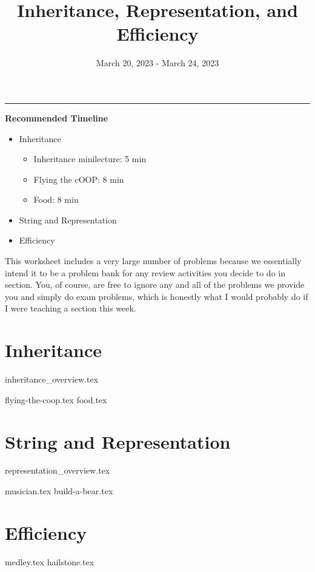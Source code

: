 \documentclass{exam}
\title{Inheritance, Representation, and Efficiency}
\date{March 20, 2023 - March 24, 2023}
\begin{document}
\maketitle
\rule{\textwidth}{0.15em}

\begin{meta}
    \textbf{Recommended Timeline}
    \begin{itemize}
        \item Inheritance
        \begin{itemize}
            \item Inheritance minilecture: 5 min
            \item Flying the cOOP: 8 min
            \item Food: 8 min
        \end{itemize}
        \item String and Representation
        \item Efficiency
    \end{itemize}
    This worksheet includes a very large number of problems because we essentially intend it to be a problem bank for any review activities you decide to do in section. You, of course, are free to ignore any and all of the problems we provide you and simply do exam problems, which is honestly what I would probably do if I were teaching a section this week. 
\end{meta}

\section{Inheritance}
{inheritance_overview.tex}
\begin{questions}
    {flying-the-coop.tex}
    \newpage
    {food.tex}
    \newpage
\end{questions}

\section{String and Representation}
{representation_overview.tex}
\begin{questions}
    {musician.tex}
    {build-a-bear.tex}
\end{questions}

\section{Efficiency}
\begin{questions}
    {medley.tex}
    {hailstone.tex}
\end{questions}
\end{document}
